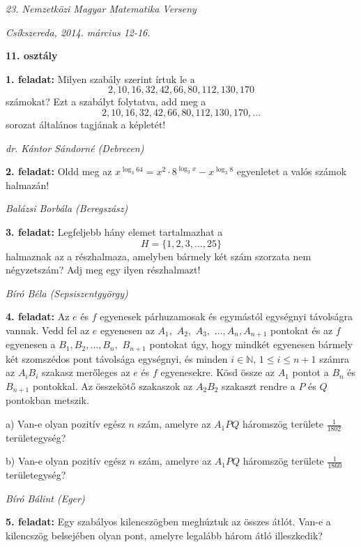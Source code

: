 \documentclass[a4paper,10pt]{article}
\newcommand{\ki}[2]{\hfill {\it #1 (#2)}\medskip}
\begin{document}
\begin{center} \Large {\em 23. Nemzetközi Magyar Matematika Verseny} \end{center}
\begin{center} \large{\em Csíkszereda, 2014. március 12-16.} \end{center}
\smallskip
\begin{center} \large{\bf 11. osztály} \end{center}
\bigskip


{\bf 1. feladat: } Milyen szabály szerint írtuk le a $$2, 10, 16, 32, 42, 66, 80,
112, 130, 170$$ számokat? Ezt a szabályt folytatva, add meg a
    \[
        2, 10, 16, 32, 42, 66, 80, 112, 130, 170, \ldots
    \]
    sorozat általános tagjának a képletét!


\ki{dr. Kántor Sándorné}{Debrecen}\medskip

{\bf 2. feladat: } Oldd meg az $\displaystyle x^{\log_3 64} = x^2\cdot8^{\log_3 x} -
x^{\log_3 8}$ egyenletet a valós számok halmazán!

\ki{Balázsi Borbála}{Beregszász}\medskip

{\bf 3. feladat: } Legfeljebb hány elemet tartalmazhat a $$H = \{1,2,3,\dots, 25\}$$
halmaznak az a részhalmaza, amelyben bármely két szám
 szorzata nem négyzetszám? Adj meg egy ilyen részhalmazt!


\ki{Bíró Béla}{Sepsiszentgyörgy}\medskip

{\bf 4. feladat: } Az $e$ és $f$ egyenesek párhuzamosak és egymástól
egységnyi távolságra vannak. Vedd fel az $e$ egyenesen az
$A_1,$ $A_2,$ $A_3,$ $\dots, A_n, A_{n+1}$ pontokat és az $f$
egyenesen a $B_1, B_2, \dots, B_n,$ $B_{n+1}$ pontokat úgy, hogy
mindkét egyenesen bármely két szomszédos pont távolsága
egységnyi, és minden $i\in\mathbb{N}$, $1\le i\le n+1$ számra
az $A_iB_i$ szakasz merőleges az $e$ és $f$ egyenesekre. Kösd
össze az $A_1$ pontot a $B_n$ és $B_{n+1}$ pontokkal. Az
összekötő sza\-ka\-szok az $A_2B_2$ szakaszt rendre a $P$
és $Q$ pontokban metszik.

a) Van-e olyan pozitív egész $n$ szám, amelyre az $A_1PQ$
háromszög területe $\displaystyle \frac{1}{1802}$
területegység?

b) Van-e olyan pozitív egész $n$ szám, amelyre az $A_1PQ$
háromszög területe $\displaystyle \frac{1}{1860}$
területegység?

\ki{Bíró Bálint}{Eger}\medskip

{\bf 5. feladat: } Egy szabályos kilencszögben meghúztuk az összes átlót.
 Van-e a kilencszög belsejében olyan pont, amelyre legalább három átló
 illeszkedik?
\end{document}
